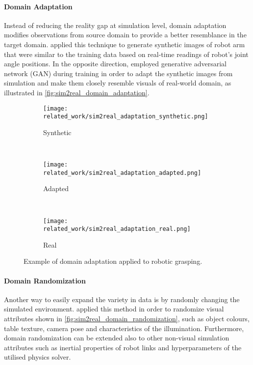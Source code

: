 \paragraph{Domain Adaptation} Instead of reducing the reality gap at simulation level, domain adaptation modifies observations from source domain to provide a better resemblance in the target domain. \citet{zhang_towards_2015} applied this technique to generate synthetic images of robot arm that were similar to the training data based on real-time readings of robot's joint angle positions. In the opposite direction, \citet{bousmalis_using_2018} employed generative adversarial network (GAN) during training in order to adapt the synthetic images from simulation and make them closely resemble visuals of real-world domain, as illustrated in \autoref{fig:sim2real_domain_adaptation}.

\begin{figure}[ht]
    \centering
    \begin{subfigure}[ht]{0.25\textwidth}
        \centering
        \texttt{[image: related\_work/sim2real\_adaptation\_synthetic.png]}
        \caption*{Synthetic}
    \end{subfigure}%
    ~
    \begin{subfigure}[ht]{0.25\textwidth}
        \centering
        \texttt{[image: related\_work/sim2real\_adaptation\_adapted.png]}
        \caption*{Adapted}
    \end{subfigure}%
    ~
    \begin{subfigure}[ht]{0.25\textwidth}
        \centering
        \texttt{[image: related\_work/sim2real\_adaptation\_real.png]}
        \caption*{Real}
    \end{subfigure}%
    \caption{Example of domain adaptation applied to robotic grasping. \protect\cite{bousmalis_using_2018}}
    \label{fig:sim2real_domain_adaptation}
\end{figure}


\paragraph{Domain Randomization} Another way to easily expand the variety in data is by randomly changing the simulated environment. \citet{tobin_domain_2017} applied this method in order to randomize visual attributes shown in \autoref{fig:sim2real_domain_randomization}, such as object colours, table texture, camera pose and characteristics of the illumination. Furthermore, domain randomization can be extended also to other non-visual simulation attributes such as inertial properties of robot links and hyperparameters of the utilised physics solver.

